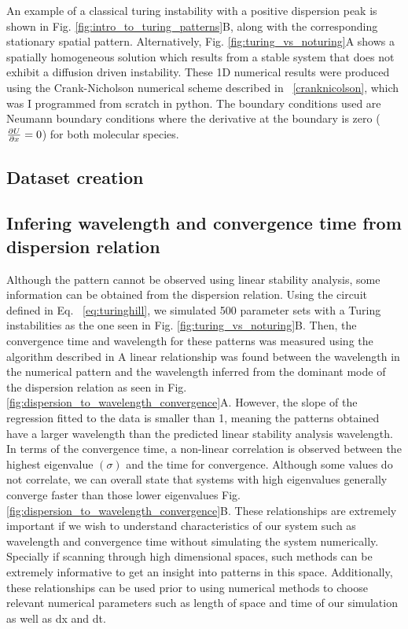 An example of a classical turing instability with a positive dispersion peak is shown in Fig. \ref{fig:intro_to_turing_patterns}B, along with the corresponding stationary spatial pattern.
Alternatively,  Fig. \ref{fig:turing_vs_noturing}A shows a spatially homogeneous solution which results from a stable system that does not exhibit a diffusion driven instability.
These 1D numerical results were produced using the Crank-Nicholson numerical scheme described in ~\ref{cranknicolson}, which was I programmed from scratch in python. The boundary conditions used are Neumann boundary conditions where the derivative at the boundary is zero ($\pdv{U}{x}=0$) for both molecular species.

\subsection{Dataset creation}


\subsection{Infering wavelength and convergence time from dispersion relation}

Although the pattern cannot be observed using linear stability analysis, some information can be obtained from the dispersion relation.
Using the circuit defined in Eq. ~\eqref{eq:turinghill}, we simulated 500 parameter sets with a Turing instabilities as the one seen in Fig. \ref{fig:turing_vs_noturing}B. Then, the convergence time and wavelength for these patterns was measured using the algorithm described in %
A linear relationship was found between the wavelength in the numerical pattern and the wavelength inferred from the dominant mode of the dispersion relation as seen in Fig. \ref{fig:dispersion_to_wavelength_convergence}A. However, the slope of the regression fitted to the data is smaller than 1, meaning the patterns obtained have a larger wavelength than the predicted linear stability analysis wavelength.
In terms of the convergence time, a non-linear correlation is observed between the highest eigenvalue $(\sigma)$ and the time for convergence.
Although some values do not correlate, we can overall state that systems with high eigenvalues generally converge faster than those lower eigenvalues Fig. \ref{fig:dispersion_to_wavelength_convergence}B.
These relationships are extremely important if we wish to understand characteristics of our system such as wavelength and convergence time without simulating the system numerically.
Specially if scanning through high dimensional spaces, such methods can be extremely informative to get an insight into patterns in this space.
Additionally, these relationships can be used prior to using numerical methods to choose relevant numerical parameters such as length of space and time of our simulation as well as dx and dt.



